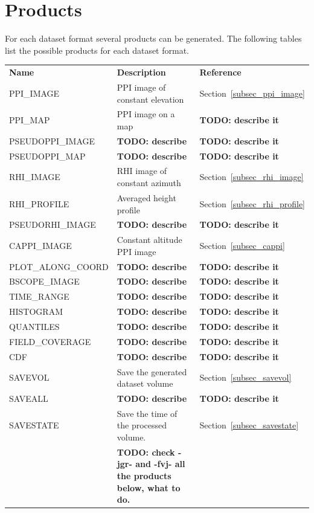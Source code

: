 \documentclass[a4paper,11pt,pdftex,twoside]{scrartcl}
\renewcommand{\bf}{\normalfont \bfseries}
\begin{document}
{{{\newpage

\section{Products}
\label{sub_products}

For each dataset format several products can be generated.
The following tables list the possible products for each dataset format.

\begin{table}[H]
\begin{tabularx}{\textwidth}{lXl}
{\bf Name}      & {\bf Description}                      & {\bf Reference}\\
PPI\_IMAGE      & PPI image of constant elevation        & Section~\ref{subsec_ppi_image}\\
PPI\_MAP        & PPI image on a map                     & {\bf TODO: describe it} \\
PSEUDOPPI\_IMAGE  & {\bf TODO: describe}                 & {\bf TODO: describe it} \\
PSEUDOPPI\_MAP  & {\bf TODO: describe}                 & {\bf TODO: describe it} \\
RHI\_IMAGE      & RHI image of constant azimuth          & Section~\ref{subsec_rhi_image}\\
RHI\_PROFILE    & Averaged height profile                & Section~\ref{subsec_rhi_profile}\\
PSEUDORHI\_IMAGE   & {\bf TODO: describe}                 & {\bf TODO: describe it} \\
CAPPI\_IMAGE        & Constant altitude PPI image            & Section~\ref{subsec_cappi}\\
PLOT\_ALONG\_COORD & {\bf TODO: describe}                 & {\bf TODO: describe it} \\
BSCOPE\_IMAGE & {\bf TODO: describe}                 & {\bf TODO: describe it} \\
TIME\_RANGE & {\bf TODO: describe}                 & {\bf TODO: describe it} \\
HISTOGRAM & {\bf TODO: describe}                 & {\bf TODO: describe it} \\
QUANTILES & {\bf TODO: describe}                 & {\bf TODO: describe it} \\
FIELD\_COVERAGE & {\bf TODO: describe}                 & {\bf TODO: describe it} \\
CDF & {\bf TODO: describe}                 & {\bf TODO: describe it} \\
SAVEVOL         & Save the generated dataset volume        & Section~\ref{subsec_savevol}\\
SAVEALL & {\bf TODO: describe}                 & {\bf TODO: describe it} \\
SAVESTATE       & Save the time of the processed volume. & Section~\ref{subsec_savestate}\\
& {\bf TODO: check -jgr- and -fvj- all the products below, what to do.} & \\


\end{tabularx}
\end{table}}}}
\end{document}
